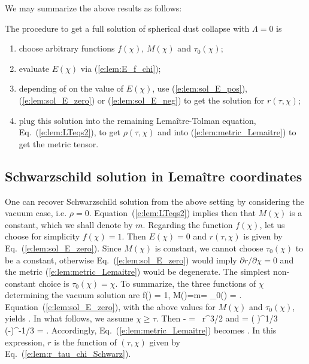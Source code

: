 We may summarize the above results as follows:
\begin{greybox}
The procedure to get a full solution of spherical dust collapse with $\Lambda=0$ is
\begin{enumerate}
\item choose arbitrary functions
$f(\chi)$, $M(\chi)$ and $\tau_0(\chi)$;
\item evaluate $E(\chi)$ via (\ref{e:lem:E_f_chi});
\item depending of
on the value of $E(\chi)$, use (\ref{e:lem:sol_E_pos}), (\ref{e:lem:sol_E_zero})
or (\ref{e:lem:sol_E_neg}) to get the solution for $r(\tau,\chi)$;
\item plug this solution into the remaining Lemaître-Tolman equation,
Eq.~(\ref{e:lem:LTeqs2}), to get $\rho(\tau,\chi)$ and into
(\ref{e:lem:metric_Lemaitre}) to get the metric tensor.
\end{enumerate}
\end{greybox}

\subsection{Schwarzschild solution in Lemaître coordinates} \label{s:lem:Schwarzschild}

One can recover Schwarzschild solution from the above setting by
considering the vacuum case, i.e. $\rho=0$.
Equation~(\ref{e:lem:LTeqs2}) implies then that $M(\chi)$ is a constant, which
we shall denote by $m$. Regarding the function $f(\chi)$, let us
choose for simplicity $f(\chi)=1$. Then $E(\chi)=0$ and $r(\tau,\chi)$
is given by Eq.~(\ref{e:lem:sol_E_zero}). Since $M(\chi)$ is constant, we
cannot choose $\tau_0(\chi)$ to be a constant, otherwise Eq.~(\ref{e:lem:sol_E_zero})
would imply $\partial r/\partial \chi=0$ and the metric
(\ref{e:lem:metric_Lemaitre}) would be degenerate.
The simplest non-constant choice is
$\tau_0(\chi) = \chi$. To summarize, the
three functions of $\chi$ determining the vacuum solution are
\be
    f(\chi) = 1, \qquad M(\chi)=m= \qand \tau_0(\chi) = \chi .
\ee
Equation~(\ref{e:lem:sol_E_zero}), with the above values for $M(\chi)$ and $\tau_0(\chi)$,
yields
\be \label{e:lem:r_tau_chi_Schwarz}
    .
\ee
In what follows, we assume $\chi\geq\tau$. Then
\be \label{e:lem:chi_tau_r_Schwarz}
    \chi - \tau =  \,  r^{3/2}
\ee
and
\be \label{e:lem:drdchi_Schwarz}
     = \left(  \right)^{1/3} (\chi-\tau)^{-1/3}
        =  .
\ee
Accordingly, Eq.~(\ref{e:lem:metric_Lemaitre}) becomes
\be \label{e:lem:Sch_met_Lem}
     .
\ee
In this expression, $r$ is the function of $(\tau,\chi)$ given
by Eq.~(\ref{e:lem:r_tau_chi_Schwarz}).


